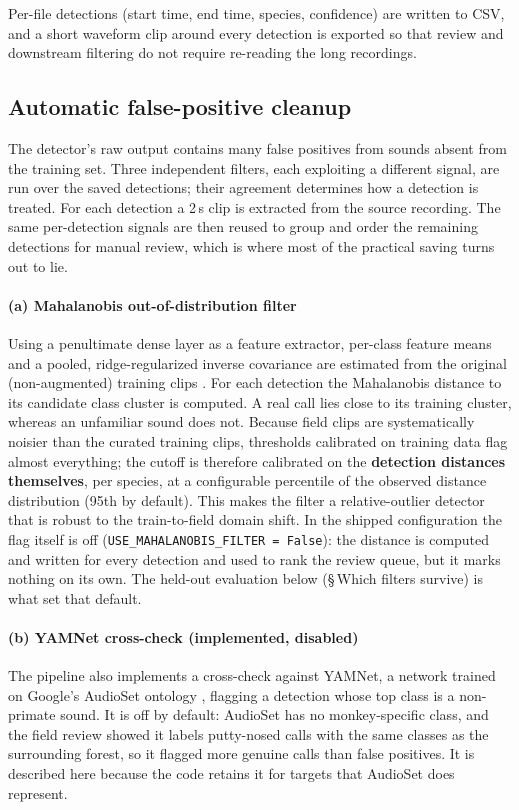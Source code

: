 \documentclass[review,3p,times]{elsarticle}
\begin{document}
Per-file detections (start time, end time, species, confidence) are written to
CSV, and a short waveform clip around every detection is exported so that
review and downstream filtering do not require re-reading the long recordings.

\subsection*{Automatic false-positive cleanup}

The detector's raw output contains many false positives from sounds absent
from the training set. Three independent filters, each exploiting a different
signal, are run over the saved detections; their agreement determines how a
detection is treated. For each detection a 2\,s clip is extracted from the
source recording. The same per-detection signals are then reused to group and
order the remaining detections for manual review, which is where most of the
practical saving turns out to lie.

\paragraph{(a) Mahalanobis out-of-distribution filter}
Using a penultimate dense layer as a feature extractor, per-class feature means
and a pooled, ridge-regularized inverse covariance are estimated from the
original (non-augmented) training clips \cite{lee2018}. For each detection the
Mahalanobis distance to its candidate class cluster is computed. A real call
lies close to its training cluster, whereas an unfamiliar sound does not.
Because field clips are systematically noisier than the curated training clips,
thresholds calibrated on training data flag almost everything; the cutoff is
therefore calibrated on the \textbf{detection distances themselves}, per
species, at a configurable percentile of the observed distance distribution
(95th by default). This makes the filter a
relative-outlier detector that is robust to the train-to-field domain shift.
In the shipped configuration the flag itself is off
(\texttt{USE\_MAHALANOBIS\_FILTER = False}): the distance is computed and
written for every detection and used to rank the review queue, but it marks
nothing on its own. The held-out evaluation below
(\S\,Which filters survive) is what set that default.

\paragraph{(b) YAMNet cross-check (implemented, disabled)}
The pipeline also implements a cross-check against YAMNet, a network trained on
Google's AudioSet ontology \cite{gemmeke2017,hershey2017}, flagging a detection
whose top class is a non-primate sound. It is off by default: AudioSet has no
monkey-specific class, and the field review showed it labels putty-nosed calls
with the same classes as the surrounding forest, so it flagged more genuine
calls than false positives. It is described here because the code retains it
for targets that AudioSet does represent.
\end{document}
